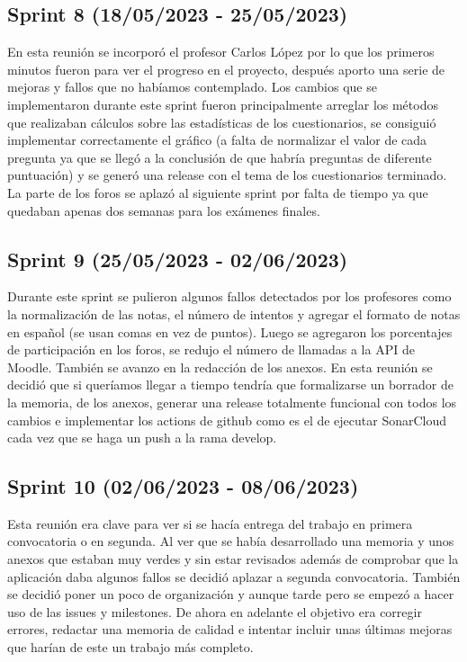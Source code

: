 \subsection{Sprint 8 (18/05/2023 - 25/05/2023)}
	En esta reunión se incorporó el profesor Carlos López por lo que los primeros minutos fueron para ver el progreso en el proyecto, después aporto una serie de mejoras y fallos que no habíamos contemplado. Los cambios que se implementaron durante este sprint fueron principalmente arreglar los métodos que realizaban cálculos sobre las estadísticas de los cuestionarios, se consiguió implementar correctamente el gráfico (a falta de normalizar el valor de cada pregunta ya que se llegó a la conclusión de que habría preguntas de diferente puntuación) y se generó una release con el tema de los cuestionarios terminado. La parte de los foros se aplazó al siguiente sprint por falta de tiempo ya que quedaban apenas dos semanas para los exámenes finales.

\subsection{Sprint 9 (25/05/2023 - 02/06/2023)}
	Durante este sprint se pulieron algunos fallos detectados por los profesores como la normalización de las notas, el número de intentos y agregar el formato de notas en español (se usan comas en vez de puntos). Luego se agregaron los porcentajes de participación en los foros, se redujo el número de llamadas a la API de Moodle. También se avanzo en la redacción de los anexos. En esta reunión se decidió que si queríamos llegar a tiempo tendría que formalizarse un borrador de la memoria, de los anexos, generar una release totalmente funcional con todos los cambios e implementar los actions de github como es el de ejecutar SonarCloud cada vez que se haga un push a la rama develop.

 \subsection{Sprint 10 (02/06/2023 - 08/06/2023)}
	Esta reunión era clave para ver si se hacía entrega del trabajo en primera convocatoria o en segunda. Al ver que se había desarrollado una memoria y unos anexos que estaban muy verdes y sin estar revisados además de comprobar que la aplicación daba algunos fallos se decidió aplazar a segunda convocatoria. También se decidió poner un poco de organización y aunque tarde pero se empezó a hacer uso de las issues y milestones. De ahora en adelante el objetivo era corregir errores, redactar una memoria de calidad e intentar incluir unas últimas mejoras que harían de este un trabajo más completo.

